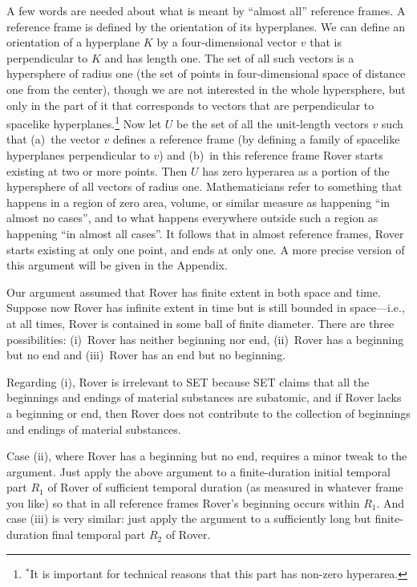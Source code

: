 A few words are needed about what is meant by ``almost all'' reference frames. A reference frame is defined by the 
orientation of its hyperplanes. We can define an orientation of a hyperplane $K$ by a four-dimensional vector $v$ that is 
perpendicular to $K$ and has length one. The set of all such vectors is a hypersphere of radius one (the set of points in 
four-dimensional space of distance one from the center), though we are not interested in the whole hypersphere, but only in 
the part of it that corresponds to vectors that are perpendicular to spacelike hyperplanes.\footnote{$^*$It is important for 
technical reasons that this part has non-zero hyperarea.} Now let $U$ be the set of all the unit-length vectors $v$ such that 
(a)~the vector $v$ defines a reference frame (by defining a family of spacelike hyperplanes perpendicular to $v$) and (b)~in 
this reference frame Rover starts existing at two or more points. Then $U$ has zero hyperarea as a portion of the hypersphere 
of all vectors of radius one. Mathematicians refer to something that happens in a region of zero area, volume, or similar 
measure as happening ``in almost no cases'', and to what happens everywhere outside such a region as happening ``in almost 
all cases''. It follows that in almost reference frames, Rover starts existing at only one point, and ends at only one.  
A more precise version of this argument will be given in the Appendix.

Our argument assumed that Rover has finite extent in both space and time. Suppose now Rover has infinite extent in time but 
is still bounded in space---i.e., at all times, Rover is contained in some ball of finite diameter.
There are three possibilities: (i)~Rover has neither beginning nor end, (ii)~Rover has a beginning but no end and (iii)~Rover
has an end but no beginning. 

Regarding (i), Rover is irrelevant to SET because SET claims that all the beginnings and endings of 
material substances are subatomic, and if Rover lacks a beginning or end, then Rover does not contribute to the collection of 
beginnings and endings of material substances. 

Case (ii), where Rover has a beginning but no end, requires a minor tweak to the argument. Just apply the above argument to 
a finite-duration initial temporal part $R_1$ of Rover of sufficient temporal duration (as measured in whatever frame 
you like)
so that in all reference frames Rover's beginning occurs within $R_1$. And case (iii) is very similar: just apply the argument to 
a sufficiently long but finite-duration final temporal part $R_2$ of Rover.

